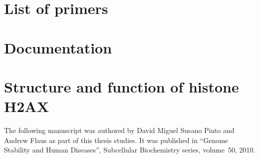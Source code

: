 \chapter{List of primers}
  \label{app:primers}

\chapter{Documentation}
  \label{app:pod-doc}
  

\chapter{Structure and function of histone H2AX}
  \label{app:h2ax-review}

  The following manuscript was authored by David Miguel Susano Pinto and
  Andrew Flaus as part of this thesis studies. It was published in ``Genome
  Stability and Human Diseases'', Subcellular Biochemistry series, volume~50,
  2010.

  


